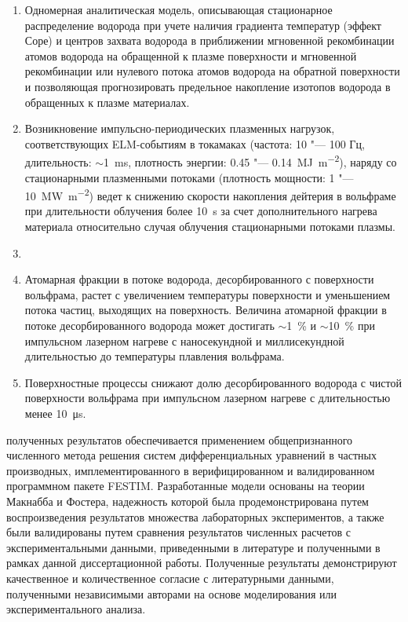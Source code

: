 {}
\begin{enumerate}[beginpenalty=10000] %
  \item Одномерная аналитическая модель, описывающая стационарное распределение водорода при учете наличия градиента температур (эффект Соре)
  и центров захвата водорода в приближении мгновенной рекомбинации атомов водорода на обращенной к плазме поверхности и мгновенной рекомбинации 
  или нулевого потока атомов водорода на обратной поверхности и позволяющая прогнозировать предельное накопление изотопов водорода в обращенных 
  к плазме материалах. 
  \item Возникновение импульсно-периодических плазменных нагрузок, соответствующих ELM-событиям в токамаках (частота: 10 "--- 100 Гц, 
  длительность: $\sim$\SI{1}{\milli\second}, плотность энергии: 0.45 "--- \SI{0.14}{\mega\joule\per\meter\squared}), наряду со стационарными плазменными потоками 
  (плотность мощности: 1 "--- \SI{10}{\mega\watt\per\meter\squared}) ведет к снижению скорости накопления дейтерия в 
  вольфраме при длительности облучения более \SI{10}{\second} за счет дополнительного нагрева материала относительно случая облучения стационарными потоками плазмы.
  \item {}
  \item Атомарная фракции в потоке водорода, десорбированного с поверхности вольфрама, растет с увеличением температуры поверхности и 
  уменьшением потока частиц, выходящих на поверхность. Величина атомарной фракции в потоке десорбированного водорода может достигать $\sim$1~\% и $\sim$10~\% 
  при импульсном лазерном нагреве с наносекундной и миллисекундной длительностью до температуры плавления вольфрама.
  \item Поверхностные процессы снижают долю десорбированного водорода с чистой поверхности вольфрама при импульсном лазерном нагреве с длительностью 
  менее \SI{10}{\micro\second}.
\end{enumerate}

{\reliability} полученных результатов обеспечивается применением общепризнанного численного метода решения систем дифференциальных уравнений в 
частных производных, имплементированного в верифицированном и валидированном программном пакете FESTIM. Разработанные модели основаны на теории Макнабба и 
Фостера, надежность которой была продемонстрирована путем воспроизведения результатов множества лабораторных экспериментов, а также были валидированы путем 
сравнения результатов численных расчетов с экспериментальными данными, приведенными в литературе и полученными в рамках
данной диссертационной работы. Полученные результаты демонстрируют качественное и количественное согласие с 
литературными данными, полученными независимыми авторами на основе моделирования или экспериментального анализа.

